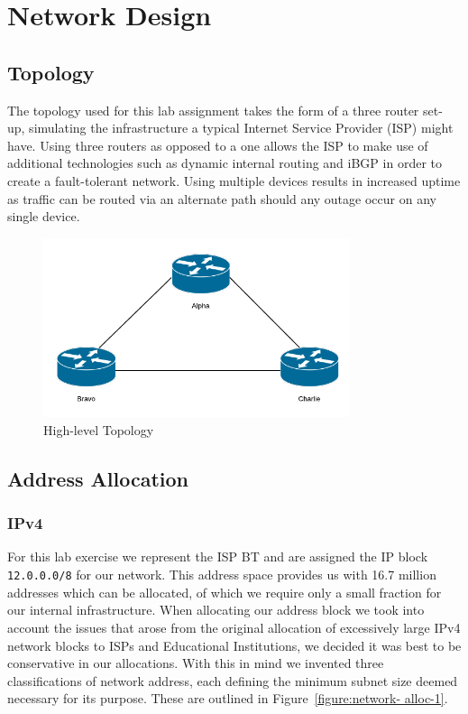 \chapter{Network Design}

\section{Topology}

The topology used for this lab assignment takes the form of a three router set-
up, simulating the infrastructure a typical Internet Service Provider (ISP)
might have. Using three routers as opposed to a one allows the ISP to make use
of additional technologies such as dynamic internal routing and iBGP in order
to create a fault-tolerant network. Using multiple devices results in increased
uptime as traffic can be routed via an alternate path should any outage occur
on any single device.

\begin{figure}[!ht]     \caption{High-level Topology}     \centering
\includegraphics[width=0.8\textwidth]{images/networkTopology.png} \end{figure}

\section{Address Allocation} \subsection{IPv4} For this lab exercise we
represent the ISP BT and are assigned the IP block \texttt{12.0.0.0/8} for our
network. This address space provides us with 16.7 million addresses which can
be allocated, of which we require only a small fraction for our internal
infrastructure. When allocating our address block we took into account the
issues that arose from the original allocation of excessively large IPv4
network blocks to ISPs and Educational Institutions, we decided it was best to
be conservative in our allocations. With this in mind we invented three
classifications of network address, each defining the minimum subnet size
deemed necessary for its purpose. These are outlined in
Figure~\ref{figure:network- alloc-1}.

